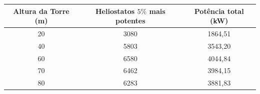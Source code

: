\documentclass[12pt,notheorems,hyperref={pdfauthor=Professor Rafael Nardi}]{beamer}
\begin{document}
\begin{frame}%
	\begin{table}
		\begin{tabular}{ccc}
			\toprule
			Altura da Torre (m) & Heliostatos $5\%$ mais potentes & Potência total (kW) \\
			\midrule
			20 & 3080 & 1864,51 \\ 
			40 & 5803 & 3543,20 \\ 
			60 & 6580 & 4044,84 \\ 
			70 & 6462 & 3984,15 \\ 
			80 & 6283 & 3881,83 \\ 
		\end{tabular}
	\end{table}
\end{frame}
\end{document}
